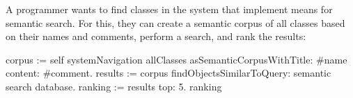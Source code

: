 %
%
%

\begin{example}
	A programmer wants to find classes in the system that implement means for semantic search.
	For this, they can create a semantic corpus of all classes based on their names and comments, perform a search, and rank the results:

	\begin{multicode}
		corpus := self systemNavigation allClasses \newline
		\null\qquad	asSemanticCorpusWithTitle: \#name \newline
		\null\qquad	content: \#comment. \newline
		results := corpus findObjectsSimilarToQuery: \textquotesingle semantic search database\textquotesingle. \newline
		ranking := results top: 5. \newline
		ranking 
	\end{multicode}
\end{example}

